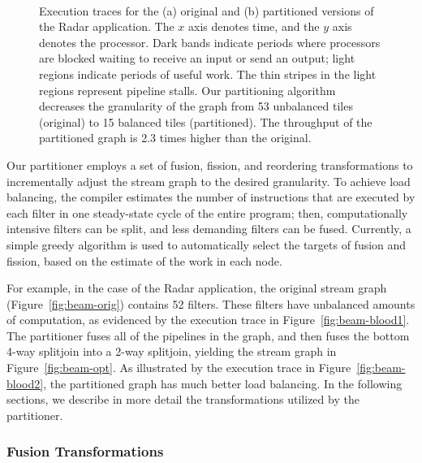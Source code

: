 \begin{figure}[!h]
   \\
  \hspace{0.3in}  \caption{\protect\small Execution
    traces for the (a) original and (b) partitioned versions of the
    Radar application.  The $x$ axis denotes time, and the $y$ axis
    denotes the processor.  Dark bands indicate periods where
    processors are blocked waiting to receive an input or send an
    output; light regions indicate periods of useful work.  The thin
    stripes in the light regions represent pipeline stalls.  Our
    partitioning algorithm decreases the granularity of the graph from
    53 unbalanced tiles (original) to 15 balanced tiles (partitioned).
    The throughput of the partitioned graph is 2.3 times higher than
    the original. \protect\label{fig:beam-blood}}
\end{figure}

Our partitioner employs a set of fusion, fission, and reordering
transformations to incrementally adjust the stream graph to the
desired granularity.  To achieve load balancing, the compiler
estimates the number of instructions that are executed by each filter
in one steady-state cycle of the entire program; then, computationally
intensive filters can be split, and less demanding filters can be
fused.  Currently, a simple greedy algorithm is used to automatically
select the targets of fusion and fission, based on the estimate of the
work in each node.


For example, in the case of the Radar application, the original
stream graph (Figure~\ref{fig:beam-orig}) contains 52 filters.  These
filters have unbalanced amounts of computation, as evidenced by the
execution trace in Figure~\ref{fig:beam-blood1}.  The partitioner
fuses all of the pipelines in the graph, and then fuses the bottom
4-way splitjoin into a 2-way splitjoin, yielding the stream graph in
Figure~\ref{fig:beam-opt}.  As illustrated by the execution trace in
Figure~\ref{fig:beam-blood2}, the partitioned graph has much better
load balancing.  In the following sections, we describe in more detail
the transformations utilized by the partitioner.


\subsubsection{Fusion Transformations}

